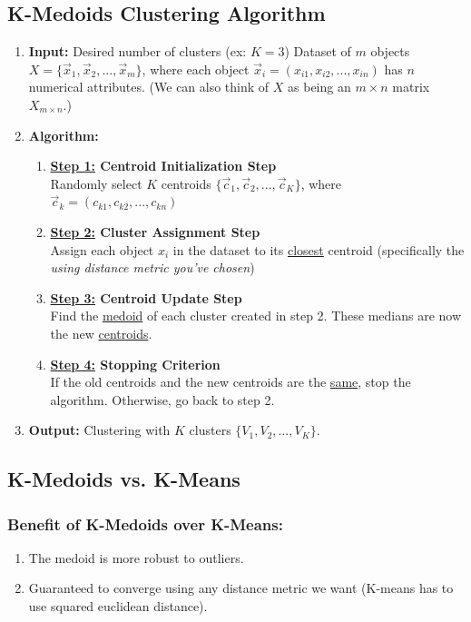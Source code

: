 \documentclass[11pt]{elegantbook}
\begin{document}
\subsection{K-Medoids Clustering Algorithm}
\begin{enumerate}
    \item \textbf{Input:}
    \subitem Desired number of clusters (ex: $K=3$)
    \subitem Dataset of $m$ objects $X=\{\vec{x}_1,\vec{x}_2,...,\vec{x}_m\}$, where each object $\vec{x}_i=(x_{i1},x_{i2},...,x_{in})$ has $n$ numerical attributes. (We can also think of $X$ as being an $m\times n$ matrix $X_{m\times n}$.)
    \item \textbf{Algorithm:}
    \begin{enumerate}[$\bullet$]
        \item \textbf{\underline{Step 1:} Centroid Initialization Step}\\
        Randomly select $K$ centroids $\{\vec{c}_1,\vec{c}_2,...,\vec{c}_K\}$, where $\vec{c}_k=(c_{k1},c_{k2},...,c_{kn})$
        \item \textbf{\underline{Step 2:} Cluster Assignment Step}\\
        Assign each object $x_i$ in the dataset to its \underline{closest} centroid (specifically the \textit{using distance metric you've chosen})
        \item \textbf{\underline{Step 3:} Centroid Update Step}\\
        Find the \underline{medoid} of each cluster created in step 2. These medians are now the new \underline{centroids}.
        \item \textbf{\underline{Step 4:} Stopping Criterion}\\
        If the old centroids and the new centroids are the \underline{same}, stop the algorithm. Otherwise, go back to step 2.
    \end{enumerate}
    \item \textbf{Output:} Clustering with $K$ clusters $\{V_1,V_2,...,V_K\}$.
\end{enumerate}

\subsection{K-Medoids vs. K-Means}
\subsubsection*{Benefit of K-Medoids over K-Means:}
\begin{enumerate}
    \item The medoid is more robust to outliers.
    \item Guaranteed to converge using any distance metric we want (K-means has to use squared euclidean distance).
\end{enumerate}
\end{document}
